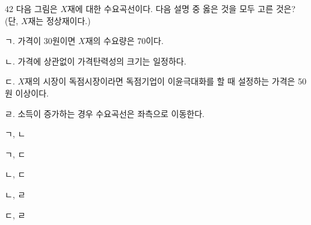 \begin{question}{42}
다음 그림은 $X$재에 대한 수요곡선이다. 다음 설명 중 옳은 것을 모두 고른 것은? (단, $X$재는 정상재이다.)
\begin{center}
\end{center}
\begin{framedtext}
ㄱ. 가격이 30원이면 $X$재의 수요량은 70이다. \par
ㄴ. 가격에 상관없이 가격탄력성의 크기는 일정하다. \par
ㄷ. $X$재의 시장이 독점시장이라면 독점기업이 이윤극대화를 할 때 설정하는 가격은 50원 이상이다. \par
ㄹ. 소득이 증가하는 경우 수요곡선은 좌측으로 이동한다. \par
\end{framedtext}
\begin{choices}
  \item ㄱ, ㄴ
  \item ㄱ, ㄷ
  \item ㄴ, ㄷ
  \item ㄴ, ㄹ
  \item ㄷ, ㄹ
\end{choices}
\end{question}
